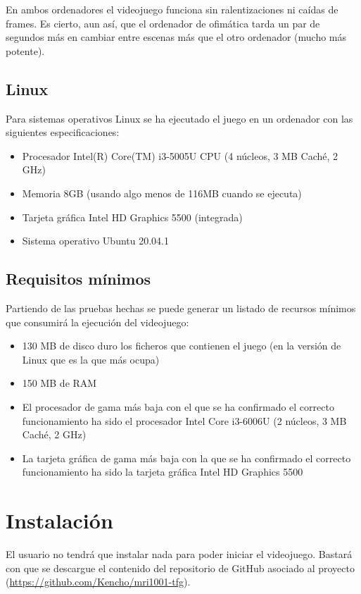 En ambos ordenadores el videojuego funciona sin ralentizaciones ni caídas de frames. Es cierto, aun así, que el ordenador de ofimática tarda un par de segundos más en cambiar entre escenas más que el otro ordenador (mucho más potente).

\subsection{Linux}
Para sistemas operativos Linux se ha ejecutado el juego en un ordenador con las siguientes especificaciones:
\begin{itemize}
\item
Procesador Intel(R) Core(TM) i3-5005U CPU (4 núcleos, 3 MB Caché, 2 GHz)
\item
Memoria 8GB (usando algo menos de 116MB cuando se ejecuta)
\item
Tarjeta gráfica Intel HD Graphics 5500 (integrada)
\item
Sistema operativo Ubuntu 20.04.1
\end{itemize}

\subsection{Requisitos mínimos}
Partiendo de las pruebas hechas se puede generar un listado de recursos mínimos que consumirá la ejecución del videojuego:
\begin{itemize}
\item
130 MB de disco duro los ficheros que contienen el juego (en la versión de Linux que es la que más ocupa)
\item
150 MB de RAM
\item
El procesador de gama más baja con el que se ha confirmado el correcto funcionamiento ha sido el procesador Intel Core i3-6006U (2 núcleos, 3 MB Caché, 2 GHz)
\item
La tarjeta gráfica de gama más baja con la que se ha confirmado el correcto funcionamiento ha sido la tarjeta gráfica Intel HD Graphics 5500
\end{itemize}

\section{Instalación}
El usuario no tendrá que instalar nada para poder iniciar el videojuego. Bastará con que se descargue el contenido del repositorio de GitHub asociado al proyecto (\url{https://github.com/Kencho/mri1001-tfg}).

